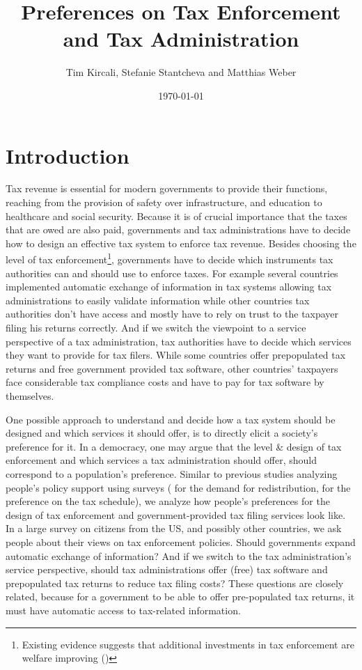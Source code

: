 \documentclass[11pt]{article}
\title{Preferences on Tax Enforcement and Tax Administration}
\author{Tim Kircali, Stefanie Stantcheva and Matthias Weber}
\date{\today} %
\begin{document}
\maketitle

\section{Introduction}
Tax revenue is essential for modern governments to provide their functions, reaching from the provision of safety over infrastructure, and education to healthcare and social security. Because it is of crucial importance that the taxes that are owed are also paid, governments and tax administrations have to decide how to design an effective tax system to enforce tax revenue. Besides choosing the level of tax enforcement\footnote{Existing evidence suggests that additional investments in tax enforcement are welfare improving (\cite{boning2025welfare})}, governments have to decide which instruments tax authorities can and should use to enforce taxes. For example several countries implemented automatic exchange of information in tax systems allowing tax administrations to easily validate information while other countries tax authorities don't have access and mostly have to rely on trust to the taxpayer filing his returns correctly. And if we switch the viewpoint to a service perspective of a tax administration, tax authorities have to decide which services they want to provide for tax filers. While some countries offer prepopulated tax returns and free government provided tax software, other countries' taxpayers face considerable tax compliance costs and have to pay for tax software by themselves.%

One possible approach to understand and decide how a tax system should be designed and which services it should offer, is to directly elicit a society’s preference for it. In a democracy, one may argue that the level \& design of tax enforcement and which services a tax administration should offer, should correspond to a population’s preference. Similar to previous studies analyzing people's policy support using surveys (\textcite{kuziemko2015elastic} for the demand for redistribution, \textcite{stantcheva2021understanding} for the preference on the tax schedule), we analyze how people's preferences for the design of tax enforcement and government-provided tax filing services look like. In a large survey on citizens from the US, and possibly other countries, we ask people about their views on tax enforcement policies. Should governments expand automatic exchange of information? And if we switch to the tax administration's service perspective, should tax administrations offer (free) tax software and prepopulated tax returns to reduce tax filing costs? These questions are closely related, because for a government to be able to offer pre-populated tax returns, it must have automatic access to tax-related information.
\end{document}

